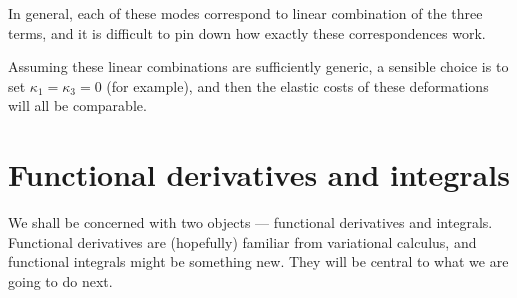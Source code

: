 \documentclass[a4paper]{article}
\begin{document}
\begin{center}
\end{center}
In general, each of these modes correspond to linear combination of the three terms, and it is difficult to pin down how exactly these correspondences work.

Assuming these linear combinations are sufficiently generic, a sensible choice is to set $\kappa_1 = \kappa_3 = 0$ (for example), and then the elastic costs of these deformations will all be comparable.

\section{Functional derivatives and integrals}
We shall be concerned with two objects --- functional derivatives and integrals. Functional derivatives are (hopefully) familiar from variational calculus, and functional integrals might be something new. They will be central to what we are going to do next.
\end{document}
